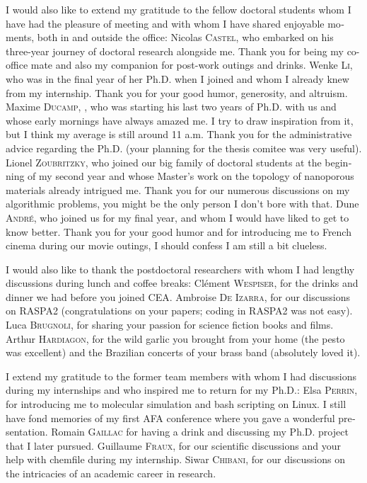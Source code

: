 \begin{otherlanguage}{english}
I would also like to extend my gratitude to the fellow doctoral students whom I have had the pleasure of meeting and with whom I have shared enjoyable moments, both in and outside the office: 
Nicolas \textsc{Castel}, who embarked on his three-year journey of doctoral research alongside me. Thank you for being my co-office mate and also my companion for post-work outings and drinks.
Wenke \textsc{Li}, who was in the final year of her Ph.D. when I joined and whom I already knew from my internship. Thank you for your good humor, generosity, and altruism.
Maxime \textsc{Ducamp}, , who was starting his last two years of Ph.D. with us and whose early mornings have always amazed me. I try to draw inspiration from it, but I think my average is still around 11 a.m. Thank you for the administrative advice regarding the Ph.D. (your planning for the thesis comitee was very useful).
Lionel \textsc{Zoubritzky}, who joined our big family of doctoral students at the beginning of my second year and whose Master's work on the topology of nanoporous materials already intrigued me. Thank you for our numerous discussions on my algorithmic problems, you might be the only person I don't bore with that.
Dune \textsc{André}, who joined us for my final year, and whom I would have liked to get to know better. Thank you for your good humor and for introducing me to French cinema during our movie outings, I should confess I am still a bit clueless.

I would also like to thank the postdoctoral researchers with whom I had lengthy discussions during lunch and coffee breaks:
Clément \textsc{Wespiser}, for the drinks and dinner we had before you joined CEA.
Ambroise \textsc{De Izarra}, for our discussions on RASPA2 (congratulations on your papers; coding in RASPA2 was not easy).
Luca \textsc{Brugnoli}, for sharing your passion for science fiction books and films.
Arthur \textsc{Hardiagon}, for the wild garlic you brought from your home (the pesto was excellent) and the Brazilian concerts of your brass band (absolutely loved it). 

I extend my gratitude to the former team members with whom I had discussions during my internships and who inspired me to return for my Ph.D.:
Elsa \textsc{Perrin}, for introducing me to molecular simulation and {\normalfont bash} scripting on {\normalfont Linux}. I still have fond memories of my first {\normalfont AFA} conference where you gave a wonderful presentation. 
Romain \textsc{Gaillac} for having a drink and discussing my Ph.D. project that I later pursued.
Guillaume \textsc{Fraux}, for our scientific discussions and your help with {\normalfont chemfile} during my internship.
Siwar \textsc{Chibani}, for our discussions on the intricacies of an academic career in research.


\end{otherlanguage}
